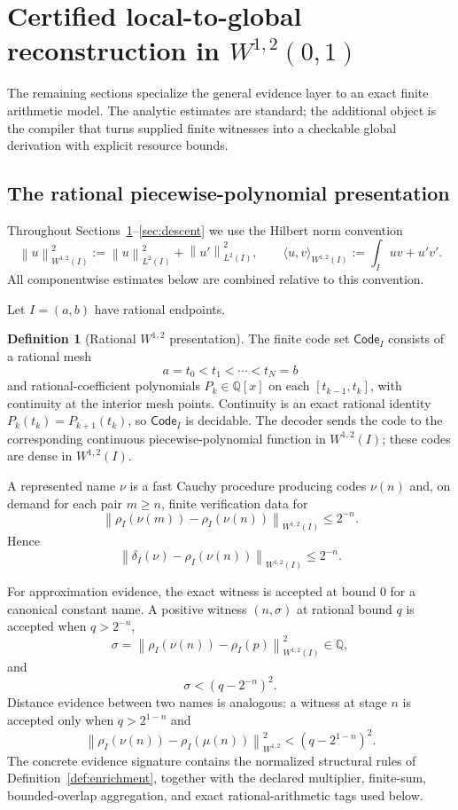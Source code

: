 \documentclass[11pt]{article}
\theoremstyle{definition}
\newtheorem{definition}[theorem]{Definition}
\newcommand{\norm}[1]{\left\lVert #1 \right\rVert}
\newcommand{\Q}{\mathbb{Q}}
\newcommand{\Code}{\mathsf{Code}}
\begin{document}
\section{Certified local-to-global reconstruction in \texorpdfstring{$W^{1,2}(0,1)$}{W12(0,1)}}\label{sec:reconstruction}

The remaining sections specialize the general evidence layer to an exact finite arithmetic
model.  The analytic estimates are standard; the additional object is the compiler that
turns supplied finite witnesses into a checkable global derivation with explicit resource
bounds.

\subsection{The rational piecewise-polynomial presentation}

Throughout Sections~\ref{sec:reconstruction}--\ref{sec:descent} we use the Hilbert norm convention
\[
 \norm{u}_{W^{1,2}(I)}^2
 :=\norm{u}_{L^2(I)}^2+\norm{u'}_{L^2(I)}^2,
 \qquad
 \langle u,v\rangle_{W^{1,2}(I)}
 :=\int_I uv+u'v'.
\]
All componentwise estimates below are combined relative to this convention.

Let $I=(a,b)$ have rational endpoints.

\begin{definition}[Rational $W^{1,2}$ presentation]\label{def:W12}
The finite code set $\Code_I$ consists of a rational mesh
\[
 a=t_0<t_1<\cdots<t_N=b
\]
and rational-coefficient polynomials $P_k\in\Q[x]$ on each
$[t_{k-1},t_k]$, with continuity at the interior mesh points.  Continuity is an exact
rational identity $P_k(t_k)=P_{k+1}(t_k)$, so $\Code_I$ is decidable.  The decoder sends
the code to the corresponding continuous piecewise-polynomial function in $W^{1,2}(I)$;
these codes are dense in $W^{1,2}(I)$.

A represented name $\nu$ is a fast Cauchy procedure producing codes $\nu(n)$ and, on
demand for each pair $m\ge n$, finite verification data for
\[
 \norm{\rho_I(\nu(m))-\rho_I(\nu(n))}_{W^{1,2}(I)}\le2^{-n}.
\]
Hence
\[
 \norm{\delta_I(\nu)-\rho_I(\nu(n))}_{W^{1,2}(I)}\le2^{-n}.
\]

For approximation evidence, the exact witness is accepted at bound $0$ for a canonical
constant name.  A positive witness $(n,\sigma)$ at rational bound $q$ is accepted when
$q>2^{-n}$,
\[
 \sigma=\norm{\rho_I(\nu(n))-\rho_I(p)}_{W^{1,2}(I)}^2\in\Q,
\]
and
\[
 \sigma<(q-2^{-n})^2.
\]
Distance evidence between two names is analogous: a witness at stage $n$ is accepted only
when $q>2^{1-n}$ and
\[
 \norm{\rho_I(\nu(n))-\rho_I(\mu(n))}_{W^{1,2}}^2
 <(q-2^{1-n})^2.
\]
The concrete evidence signature contains the normalized structural rules of
Definition~\ref{def:enrichment}, together with the declared multiplier, finite-sum,
bounded-overlap aggregation, and exact rational-arithmetic tags used below.
\end{definition}
\end{document}
